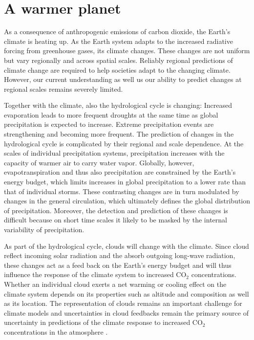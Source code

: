 \section{A warmer planet}

As a consequence of anthropogenic emissions of carbon dioxide, the Earth's
 climate is heating up. As the Earth system adapts to the increased radiative
 forcing from greenhouse gases, its climate changes. These changes are not
 uniform but vary regionally and across spatial scales. Reliably regional
 predictions of climate change are required to help societies adapt to the
 changing climate. However, our current understanding as well us our ability to
 predict changes at regional scales remains severely limited.

Together with the climate, also the hydrological cycle is changing: Increased
evaporation leads to more frequent droughts at the same time as global
precipitation is expected to increase. Extreme precipitation events are
strengthening and becoming more frequent. The prediction of changes in the
hydrological cycle is complicated by their regional and scale dependence. At the
scales of individual precipitation systems, precipitation increases with the
capacity of warmer air to carry water vapor. Globally, however,
evapotranspiration and thus also precipitation are constrained by the Earth's
energy budget, which limits increases in global precipitation to a lower rate
than that of individual storms\citep{collins13}. These contrasting changes are
in turn modulated by changes in the general circulation, which ultimately
defines the global distribution of precipitation. Moreover, the detection and
prediction of these changes is difficult because on short time scales it likely
to be masked by the internal variability of precipitation.

As part of the hydrological cycle, clouds will change with the climate. Since
cloud reflect incoming solar radiation and the absorb outgoing long-wave
radiation, these changes act as a feed back on the Earth's energy budget and
will thus influence the response of the climate system to increased CO$_2$
concentrations. Whether an individual cloud exerts a net warming or cooling
effect on the climate system depends on its properties such as altitude and
composition as well as its location. The representation of clouds remains an
important challenge for climate models and uncertainties in cloud feedbacks
remain the primary source of uncertainty in predictions of the climate response
to increased CO$_2$ concentrations in the atmosphere \citep{zelinka20}.

